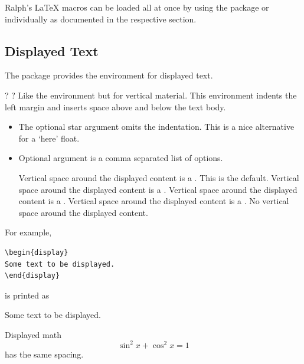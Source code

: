 \documentclass{scrartcl}
\begin{document}
Ralph's \LaTeX{} macros can be loaded all at once by using the
 package or individually as documented in the
respective section.


\subsection{Displayed Text}

The  package provides the  environment
for displayed text.

\begin{definition}
 \code{*}\kleene? \kleene?
Like the  environment but for vertical material.
This environment indents the left margin and inserts space above and
below the text body.
\begin{itemize}
\item The optional star argument omits the indentation.  This is a
nice alternative for a ‘here’ float.
\item Optional argument  is a comma separated list of
options.
\begin{description}
Vertical space around the displayed content is a
\symb{\bigskipamount}.  This is the default.
Vertical space around the displayed content is a
\symb{\medskipamount}.
Vertical space around the displayed content is a
\symb{\smallskipamount}.
Vertical space around the displayed content is a
\symb{\parskip}.
No vertical space around the displayed content.
\end{description}
\end{itemize}
\end{definition}

For example,
\begin{display}
\begin{verbatim}
\begin{display}
Some text to be displayed.
\end{display}
\end{verbatim}
\end{display}
is printed as
\begin{display}
Some text to be displayed.
\end{display}
Displayed math
\begin{displaymath}
\sin^2 x + \cos^2 x = 1
\end{displaymath}
has the same spacing.
\end{document}
